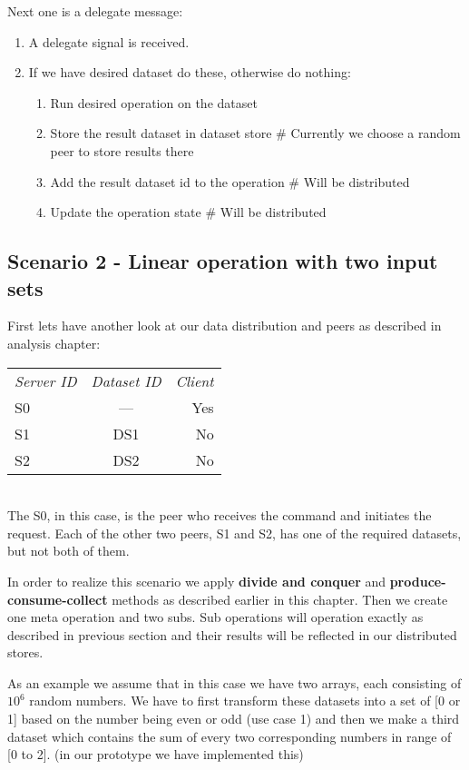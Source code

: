 Next one is a delegate message:
\begin{enumerate}
\item A delegate signal is received.
\item If we have desired dataset do these, otherwise do nothing:
  \begin{enumerate}
  \item Run desired operation on the dataset
  \item Store the result dataset in dataset store \# Currently we choose a random peer to store results there
  \item Add the result dataset id to the operation \# Will be distributed
  \item Update the operation state \# Will be distributed
  \end{enumerate}
\end{enumerate}

\subsection{Scenario 2 - Linear operation with two input sets}
First lets have another look at our data distribution and peers as described in analysis chapter:

\begin{tabular}{ l c r }
\em{Server ID} & \em{ Dataset ID} & \em{ Client} \\
S0 & --- & Yes \\
S1 & DS1 & No \\
S2 & DS2 & No \\
\end{tabular}\\

The S0, in this case, is the peer who receives the command and initiates the request. 
Each of the other two peers, S1 and S2, has one of the required datasets, but not both of them. 

In order to realize this scenario we apply \textbf{divide and conquer} and \textbf{produce-consume-collect} methods
as described earlier in this chapter. Then we create one meta operation and two subs. Sub operations will operation exactly as described in previous section
and their results will be reflected in our distributed stores.

As an example we assume that in this case we have two arrays, each consisting of \(10^6\) random numbers. 
We have to first transform these datasets into a set of [0 or 1] based on the number being even or odd (use case 1) 
and then we make a third dataset which contains the sum of every two corresponding numbers in range of [0 to 2].
(in our prototype we have implemented this)

